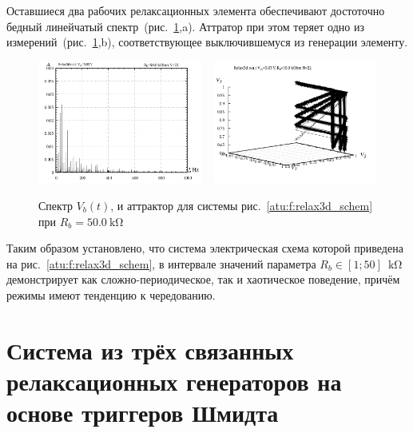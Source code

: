 Оставшиеся два рабочих релаксационных элемента обеспечивают
достоточно бедный линейчатый спектр~(рис.~\ref{atu:f:relax3d_f_22},a).
Аттратор при этом теряет одно из измерений~(рис.~\ref{atu:f:relax3d_f_22},b),
соответствующее выключившемуся из генерации элементу.

\begin{figure}[htb!]
  \centerline{
    \includegraphics[width=0.48\textwidth]{p/relax3d_f_22.png}
    ~
    \includegraphics[width=0.48\textwidth]{p/relax3d_v1v2v3_22.png}
  }
  \caption{Спектр $V_b(t)$, и аттрактор для системы рис.~\ref{atu:f:relax3d_schem} при $R_b=\SI{50.0}{\kilo\ohm}$ }
  \label{atu:f:relax3d_f_22}
\end{figure}

Таким образом установлено, что
система электрическая схема которой приведена на рис.~\ref{atu:f:relax3d_schem},
в интервале значений параметра $R_b \in [1;50]\;\SI{}{\kilo\ohm}$
демонстрирует как сложно-периодическое, так и хаотическое поведение,
причём режимы имеют тенденцию к чередованию.

\section{Система из трёх связанных релаксационных генераторов на основе триггеров Шмидта}
\label{atu:sec:relax3ds}

